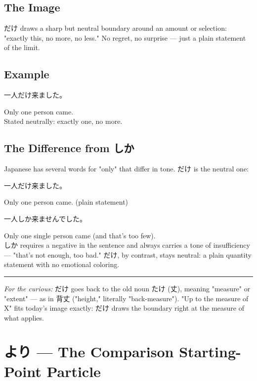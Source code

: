 \documentclass[12pt]{book}
\begin{document}
\section*{The Image}

だけ draws a sharp but neutral boundary around an amount or selection: "exactly this, no more, no less." No regret, no surprise — just a plain statement of the limit.

\section*{Example}

\par\quad 一人だけ来ました。\\
\par\quad Only one person came.\\

Stated neutrally: exactly one, no more.

\section*{The Difference from しか}

Japanese has several words for "only" that differ in tone. だけ is the neutral one:

\par\quad 一人だけ来ました。\\
\par\quad Only one person came. (plain statement)\\

\par\quad 一人しか来ませんでした。\\
\par\quad Only one single person came (and that's too few).\\

しか requires a negative in the sentence and always carries a tone of insufficiency — "that's not enough, too bad." だけ, by contrast, stays neutral: a plain quantity statement with no emotional coloring.

\bigskip\hrule\bigskip

\emph{For the curious:} だけ goes back to the old noun たけ (丈), meaning "measure" or "extent" — as in 背丈 ("height," literally "back-measure"). "Up to the measure of X" fits today's image exactly: だけ draws the boundary right at the measure of what applies.


\chapter{より — The Comparison Starting-Point Particle}
\end{document}
